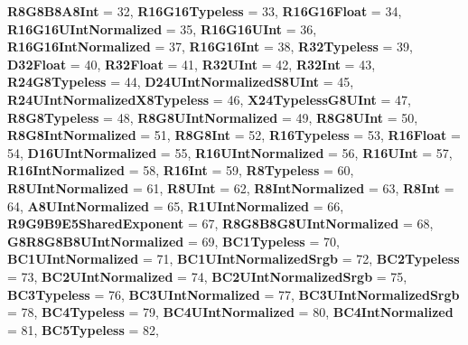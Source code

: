 \begin{DoxyCompactItemize}
{\bfseries R8\+G8\+B8\+A8\+Int} = 32, 
{\bfseries R16\+G16\+Typeless} = 33, 
{\bfseries R16\+G16\+Float} = 34, 
\newline
{\bfseries R16\+G16\+U\+Int\+Normalized} = 35, 
{\bfseries R16\+G16\+U\+Int} = 36, 
{\bfseries R16\+G16\+Int\+Normalized} = 37, 
{\bfseries R16\+G16\+Int} = 38, 
\newline
{\bfseries R32\+Typeless} = 39, 
{\bfseries D32\+Float} = 40, 
{\bfseries R32\+Float} = 41, 
{\bfseries R32\+U\+Int} = 42, 
\newline
{\bfseries R32\+Int} = 43, 
{\bfseries R24\+G8\+Typeless} = 44, 
{\bfseries D24\+U\+Int\+Normalized\+S8\+U\+Int} = 45, 
{\bfseries R24\+U\+Int\+Normalized\+X8\+Typeless} = 46, 
\newline
{\bfseries X24\+Typeless\+G8\+U\+Int} = 47, 
{\bfseries R8\+G8\+Typeless} = 48, 
{\bfseries R8\+G8\+U\+Int\+Normalized} = 49, 
{\bfseries R8\+G8\+U\+Int} = 50, 
\newline
{\bfseries R8\+G8\+Int\+Normalized} = 51, 
{\bfseries R8\+G8\+Int} = 52, 
{\bfseries R16\+Typeless} = 53, 
{\bfseries R16\+Float} = 54, 
\newline
{\bfseries D16\+U\+Int\+Normalized} = 55, 
{\bfseries R16\+U\+Int\+Normalized} = 56, 
{\bfseries R16\+U\+Int} = 57, 
{\bfseries R16\+Int\+Normalized} = 58, 
\newline
{\bfseries R16\+Int} = 59, 
{\bfseries R8\+Typeless} = 60, 
{\bfseries R8\+U\+Int\+Normalized} = 61, 
{\bfseries R8\+U\+Int} = 62, 
\newline
{\bfseries R8\+Int\+Normalized} = 63, 
{\bfseries R8\+Int} = 64, 
{\bfseries A8\+U\+Int\+Normalized} = 65, 
{\bfseries R1\+U\+Int\+Normalized} = 66, 
\newline
{\bfseries R9\+G9\+B9\+E5\+Shared\+Exponent} = 67, 
{\bfseries R8\+G8\+B8\+G8\+U\+Int\+Normalized} = 68, 
{\bfseries G8\+R8\+G8\+B8\+U\+Int\+Normalized} = 69, 
{\bfseries B\+C1\+Typeless} = 70, 
\newline
{\bfseries B\+C1\+U\+Int\+Normalized} = 71, 
{\bfseries B\+C1\+U\+Int\+Normalized\+Srgb} = 72, 
{\bfseries B\+C2\+Typeless} = 73, 
{\bfseries B\+C2\+U\+Int\+Normalized} = 74, 
\newline
{\bfseries B\+C2\+U\+Int\+Normalized\+Srgb} = 75, 
{\bfseries B\+C3\+Typeless} = 76, 
{\bfseries B\+C3\+U\+Int\+Normalized} = 77, 
{\bfseries B\+C3\+U\+Int\+Normalized\+Srgb} = 78, 
\newline
{\bfseries B\+C4\+Typeless} = 79, 
{\bfseries B\+C4\+U\+Int\+Normalized} = 80, 
{\bfseries B\+C4\+Int\+Normalized} = 81, 
{\bfseries B\+C5\+Typeless} = 82, 

\end{DoxyCompactItemize}
